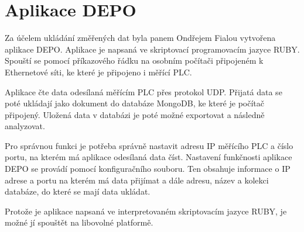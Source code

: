 \section{Aplikace DEPO} 
\label{aplikacedepo}
Za účelem ukládání změřených dat byla panem Ondřejem Fialou vytvořena aplikace DEPO. Aplikace je napsaná ve skriptovací programovacím jazyce RUBY. Spouští se pomocí příkazového řádku na osobním počítači připojeném k Ethernetové síti, ke které je připojeno i měřící PLC. 

Aplikace čte data odesílaná měřícím PLC přes protokol UDP. Přijatá data se poté ukládají jako dokument do databáze MongoDB, ke které je počítač připojený. Uložená data v databázi je poté možné exportovat a následně analyzovat.

Pro správnou funkci je potřeba správně nastavit adresu IP měřícího PLC a číslo portu, na kterém má aplikace odesílaná data číst. Nastavení funkčnosti aplikace DEPO se provádí pomocí konfiguračního souboru. Ten obsahuje informace o IP adrese a portu na kterém má data přijímat a dále adresu, název a kolekci databáze, do které se mají data ukládat.

Protože je aplikace napsaná ve interpretovaném skriptovacím jazyce RUBY, je možné jí spouštět na libovolné platformě.

